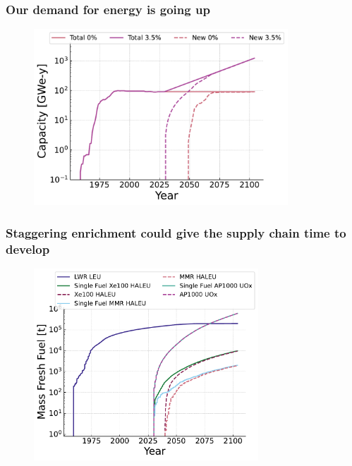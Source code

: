 \documentclass[9pt]{beamer}
\begin{document}
  \begin{frame}
    \frametitle{Our demand for energy is going up}
    \begin{figure}
        \centering
        \includegraphics[width=0.85\textwidth]{../images/new_capacity_ng_d2.pdf}
    \end{figure}
  \end{frame}

  \begin{frame}
    \frametitle{Staggering enrichment could give the supply chain time to develop}
    \begin{figure}
        \centering
        \includegraphics[width=0.75\textwidth]{../images/fresh_fuel.pdf}
    \end{figure}
  \end{frame}
\end{document}
